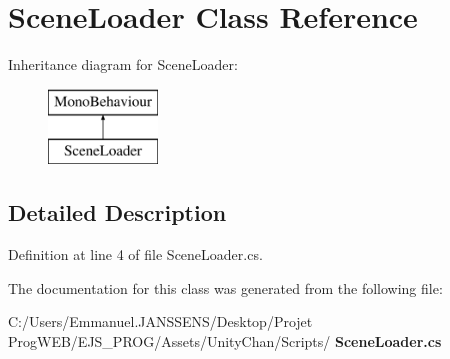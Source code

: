 \section{Scene\+Loader Class Reference}
\label{class_scene_loader}
Inheritance diagram for Scene\+Loader\+:\begin{figure}[H]
\begin{center}
\leavevmode
\includegraphics[height=2.000000cm]{class_scene_loader}
\end{center}
\end{figure}


\subsection{Detailed Description}


Definition at line 4 of file Scene\+Loader.\+cs.



The documentation for this class was generated from the following file\+:\begin{DoxyCompactItemize}
\item 
C\+:/\+Users/\+Emmanuel.\+J\+A\+N\+S\+S\+E\+N\+S/\+Desktop/\+Projet Prog\+W\+E\+B/\+E\+J\+S\+\_\+\+P\+R\+O\+G/\+Assets/\+Unity\+Chan/\+Scripts/\textbf{ Scene\+Loader.\+cs}\end{DoxyCompactItemize}
